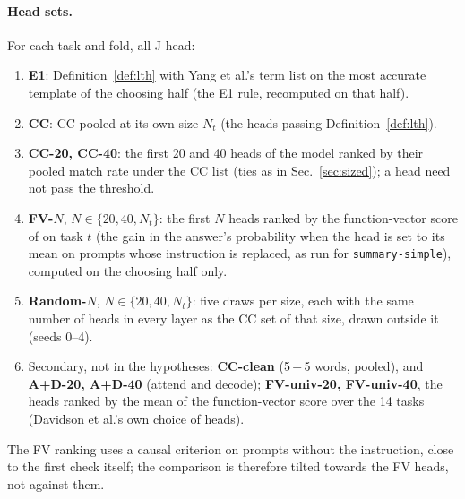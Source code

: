 \documentclass[11pt,a4paper]{article}
\begin{document}
\paragraph{Head sets.} For each task and fold, all J-head:
\begin{enumerate}
  \item \textbf{E1}: Definition~\ref{def:lth} with Yang et al.'s term list on the most accurate template
    of the choosing half (the E1 rule, recomputed on that half).
  \item \textbf{CC}: CC-pooled at its own size $N_t$ (the heads passing Definition~\ref{def:lth}).
  \item \textbf{CC-20, CC-40}: the first 20 and 40 heads of the model ranked by their pooled
    match rate under the CC list (ties as in Sec.~\ref{sec:sized}); a head need not pass the threshold.
  \item \textbf{FV-$N$}, $N \in \{20, 40, N_t\}$: the first $N$ heads ranked by the
    function-vector score of \citet{davidson2025different} on task $t$ (the gain in the answer's
    probability when the head is set to its mean on prompts whose instruction is replaced, as
    run for \texttt{summary-simple}), computed on the choosing half only.
  \item \textbf{Random-$N$}, $N \in \{20, 40, N_t\}$: five draws per size, each with the same
    number of heads in every layer as the CC set of that size, drawn outside it (seeds 0--4).
  \item Secondary, not in the hypotheses: \textbf{CC-clean} (5\,+\,5 words, pooled), and
    \textbf{A+D-20, A+D-40} (attend and decode); \textbf{FV-univ-20, FV-univ-40}, the heads
    ranked by the mean of the function-vector score over the 14 tasks (Davidson et al.'s own
    choice of heads).
\end{enumerate}
The FV ranking uses a causal criterion on prompts without the instruction, close to the first
check itself; the comparison is therefore tilted towards the FV heads, not against them.
\end{document}
